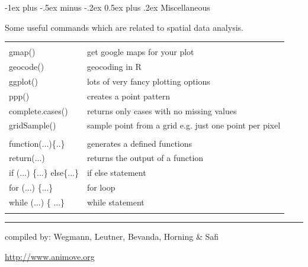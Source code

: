 \documentclass[10pt,landscape]{article}
\makeatletter
\renewcommand{\section}{\@startsection{section}{1}{0mm}%
                                {-1ex plus -.5ex minus -.2ex}%
                                {0.5ex plus .2ex}%
                                {\normalfont\large\bfseries}}
\makeatother
\begin{document}
\begin{multicols}{3}
\begin{tabular}{@{}p{\the\MyLen}%
                @{}p{\linewidth-\the\MyLen}@{}}
\end{tabular}




\section{Miscellaneous}

Some useful commands which are related to spatial data analysis.


\begin{tabular}{@{}p{\the\MyLen}%
                @{}p{\linewidth-\the\MyLen}@{}}
                & \\
gmap() & get google maps for your plot \\
geocode() & geocoding in R \\
ggplot() & lots of very fancy plotting options \\
ppp() & creates a point pattern \\

complete.cases() &  returns only cases with no missing values \\                
gridSample() & sample point from a grid e.g. just one point per pixel \\

 & \\
function(...)\{..\} & generates a defined functions\\
return(...) & returns the output of a function \\
if (...) \{...\} else\{...\} & if else statement \\
for (...) \{...\} & for loop \\
while (...) \{ ...\} & while statement \\
 & \\


\end{tabular}




\scriptsize

\rule{0.32\textwidth}{0.4pt}

compiled by: Wegmann, Leutner, Bevanda, Horning \& Safi \\ \THEYEAR	

\url{http://www.animove.org}


\bigskip

\bigskip


\end{multicols}
\end{document}
